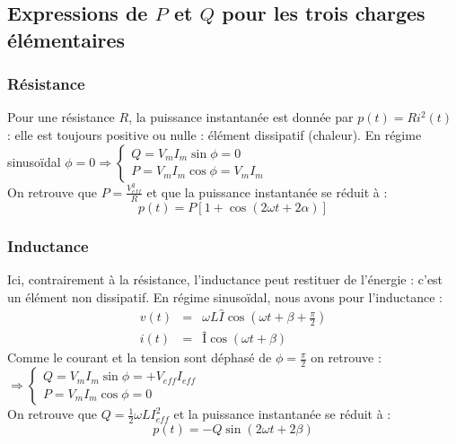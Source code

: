 \documentclass	[11pt, a4paper, openany]{book}
\begin{document}
\setcounter{subsection}{3}
\subsection{Expressions de $P$ et $Q$ pour les trois charges élémentaires}
\subsubsection{Résistance}
Pour une résistance $R$, la puissance instantanée est donnée par $p(t) = Ri^2(t)$ : elle est toujours positive ou nulle : élément dissipatif (chaleur).
En régime sinusoïdal $\phi = 0 \Rightarrow  \left\{\begin{array}{l}
Q = V_mI_m\sin\phi = 0\\
P = V_mI_m\cos\phi = V_mI_m
\end{array}\right.$\\
On retrouve que $P = \frac{V_{eff}^2}{R}$ et que la puissance instantanée se réduit à :
\begin{equation}
p(t) = P[1 + \cos(2\omega t + 2\alpha)]
\end{equation}

\subsubsection{Inductance}
Ici, contrairement à la résistance, l'inductance peut restituer de l'énergie : c'est un élément non dissipatif. En régime sinusoïdal, nous avons pour l'inductance :
\begin{eqnarray}
v(t) &=& \omega L\hat I\cos(\omega t + \beta + \frac{\pi}{2})\\
i(t) &=& Î\cos(\omega t + \beta)
\end{eqnarray}
Comme le courant et la tension sont déphasé de $\phi = \frac{\pi}{2}$ on retrouve : $\Rightarrow  \left\{\begin{array}{l}
Q = V_mI_m\sin\phi = +V_{eff}I_{eff}\\
P = V_mI_m\cos\phi = 0
\end{array}\right.$\\
On retrouve que $Q = \frac{1}{2}\omega LI_{eff}^2$ et la puissance instantanée se réduit à : 
\begin{equation}
p(t) = -Q\sin(2\omega t + 2\beta)
\end{equation}
\end{document}
